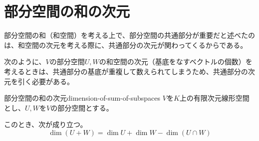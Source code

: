 \documentclass[../../../topic_linear-algebra]{subfiles}
\begin{document}
\sectionline
\section{部分空間の和の次元}

部分空間の和（和空間）を考える上で、部分空間の共通部分が重要だと述べたのは、和空間の次元を考える際に、共通部分の次元が関わってくるからである。

\br

次のように、$V$の部分空間$U, W$の和空間の次元（基底をなすベクトルの個数）を考えるときは、共通部分の基底が重複して数えられてしまうため、共通部分の次元を引く必要がある。

\begin{theorem}{部分空間の和の次元}{dimension-of-sum-of-subspaces}
  $V$を$K$上の有限次元線形空間とし、$U, W$を$V$の部分空間とする。
  
  このとき、次が成り立つ。
  \begin{equation*}
    \dim(U + W) = \dim U + \dim W - \dim(U \cap W)
  \end{equation*}
\end{theorem}
\end{document}
